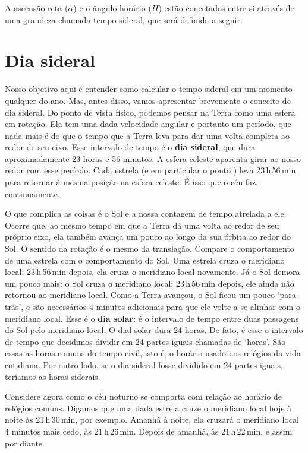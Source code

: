 A ascensão reta ($\alpha$) e o ângulo horário ($H$) estão conectados entre si através de uma grandeza chamada tempo sideral, que será definida a seguir.

\newpage
\section{Dia sideral}

Nosso objetivo aqui é entender como calcular o tempo sideral em um momento qualquer do ano. Mas, antes disso, vamos apresentar brevemente o conceito de dia sideral. Do ponto de vista físico, podemos pensar na Terra como uma esfera em rotação. Ela tem uma dada velocidade angular e portanto um período, que nada mais é do que o tempo que a Terra leva para dar uma volta completa ao redor de seu eixo. Esse intervalo de tempo é o \textbf{dia sideral}, que dura aproximadamente 23 horas e 56 minutos. A esfera celeste aparenta girar ao nosso redor com esse período. Cada estrela (e em particular o ponto \Aries) leva 23\,h\,56\,min para retornar à mesma posição na esfera celeste. É isso que o céu faz, continuamente.

O que complica as coisas é o Sol e a nossa contagem de tempo atrelada a ele. Ocorre que, ao mesmo tempo em que a Terra dá uma volta ao redor de seu próprio eixo, ela também avança um pouco ao longo da sua órbita ao redor do Sol. O sentido da rotação é o mesmo da translação. Compare o comportamento de uma estrela com o comportamento do Sol. Uma estrela cruza o meridiano local; 23\,h\,56\,min depois, ela cruza o meridiano local novamente. Já o Sol demora um pouco mais: o Sol cruza o meridiano local; 23\,h\,56\,min depois, ele ainda não retornou ao meridiano local. Como a Terra avançou, o Sol ficou um pouco `para trás', e são necessários 4 minutos adicionais para que ele volte a se alinhar com o meridiano local. Esse é o \textbf{dia solar}: é o intervalo de tempo entre duas passagens do Sol pelo meridiano local. O dial solar dura 24 horas. De fato, é esse o intervalo de tempo que decidimos dividir em 24 partes iguais chamadas de `horas'. São essas as horas comuns do tempo civil, isto é, o horário usado nos relógios da vida cotidiana. Por outro lado, se o dia sideral fosse dividido em 24 partes iguais, teríamos as horas siderais.

Considere agora como o céu noturno se comporta com relação ao horário de relógios comuns. Digamos que uma dada estrela cruze o meridiano local hoje à noite às 21\,h\,30\,min, por exemplo. Amanhã à noite, ela cruzará o meridiano local 4 minutos mais cedo, às 21\,h\,26\,min. Depois de amanhã, às 21\,h\,22\,min, e assim por diante.

